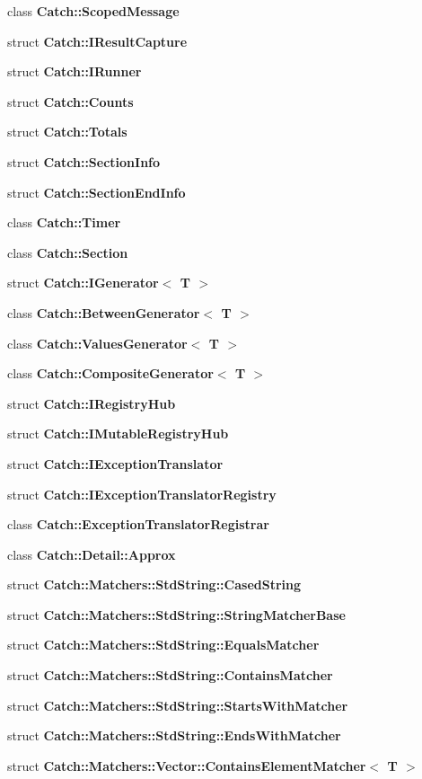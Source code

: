 \begin{DoxyCompactItemize}
class \textbf{ Catch\+::\+Scoped\+Message}
\item 
struct \textbf{ Catch\+::\+I\+Result\+Capture}
\item 
struct \textbf{ Catch\+::\+I\+Runner}
\item 
struct \textbf{ Catch\+::\+Counts}
\item 
struct \textbf{ Catch\+::\+Totals}
\item 
struct \textbf{ Catch\+::\+Section\+Info}
\item 
struct \textbf{ Catch\+::\+Section\+End\+Info}
\item 
class \textbf{ Catch\+::\+Timer}
\item 
class \textbf{ Catch\+::\+Section}
\item 
struct \textbf{ Catch\+::\+I\+Generator$<$ T $>$}
\item 
class \textbf{ Catch\+::\+Between\+Generator$<$ T $>$}
\item 
class \textbf{ Catch\+::\+Values\+Generator$<$ T $>$}
\item 
class \textbf{ Catch\+::\+Composite\+Generator$<$ T $>$}
\item 
struct \textbf{ Catch\+::\+I\+Registry\+Hub}
\item 
struct \textbf{ Catch\+::\+I\+Mutable\+Registry\+Hub}
\item 
struct \textbf{ Catch\+::\+I\+Exception\+Translator}
\item 
struct \textbf{ Catch\+::\+I\+Exception\+Translator\+Registry}
\item 
class \textbf{ Catch\+::\+Exception\+Translator\+Registrar}
\item 
class \textbf{ Catch\+::\+Detail\+::\+Approx}
\item 
struct \textbf{ Catch\+::\+Matchers\+::\+Std\+String\+::\+Cased\+String}
\item 
struct \textbf{ Catch\+::\+Matchers\+::\+Std\+String\+::\+String\+Matcher\+Base}
\item 
struct \textbf{ Catch\+::\+Matchers\+::\+Std\+String\+::\+Equals\+Matcher}
\item 
struct \textbf{ Catch\+::\+Matchers\+::\+Std\+String\+::\+Contains\+Matcher}
\item 
struct \textbf{ Catch\+::\+Matchers\+::\+Std\+String\+::\+Starts\+With\+Matcher}
\item 
struct \textbf{ Catch\+::\+Matchers\+::\+Std\+String\+::\+Ends\+With\+Matcher}
\item 
struct \textbf{ Catch\+::\+Matchers\+::\+Vector\+::\+Contains\+Element\+Matcher$<$ T $>$}

\end{DoxyCompactItemize}
